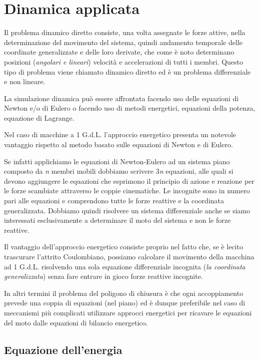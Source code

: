 	\chapter{Dinamica applicata}
		Il problema dinamico diretto consiste, una volta assegnate le forze attive, nella determinazione del movimento del sistema, quindi andamento temporale delle coordinate generalizzate e delle loro derivate, che come è noto determinano posizioni (\emph{angolari e lineari}) velocità e accelerazioni di tutti i membri. Questo tipo di problema viene chiamato dinamico diretto ed è un problema differenziale e non lineare.
		
		La simulazione dinamica può essere affrontata facendo uso delle equazioni di Newton e/o di Eulero o facendo uso di metodi energetici, equazioni della potenza, equazione di Lagrange.
		
		Nel caso di macchine a 1 G.d.L. l'approccio energetico presenta un notevole vantaggio rispetto al metodo basato sulle equazioni di Newton e di Eulero.
		
		Se infatti applichiamo le equazioni di Newton-Eulero ad un sistema piano composto da \emph{n} membri mobili dobbiamo scrivere 3\emph{n} equazioni, alle quali si devono aggiungere le equazioni che esprimono il principio di azione e reazione per le forze scambiate attraverso le coppie cinematiche. Le incognite sono in numero pari alle equazioni e comprendono tutte le forze reattive e la coordinata generalizzata. Dobbiamo quindi risolvere un sistema differenziale anche se siamo interessati esclusivamente a determinare il moto del sistema e non le forze reattive.
		
		Il vantaggio dell'approccio energetico consiste proprio nel fatto che, se è lecito trascurare l'attrito Coulombiano, possiamo calcolare il movimento della macchina ad 1 G.d.L. risolvendo una sola equazione differenziale incognita (\emph{la coordinata generalizzata}) senza fare entrare in gioco forze reattive incognite.
		
		In altri termini il problema del poligono di chiusura è che ogni accoppiamento prevede una coppia di equazioni (nel piano) ed è dunque preferibile nel caso di meccanismi più complicati utilizzare approcci energetici per ricavare le equazioni del moto dalle equazioni di bilancio energetico.
		
		\section{Equazione dell'energia}
		
